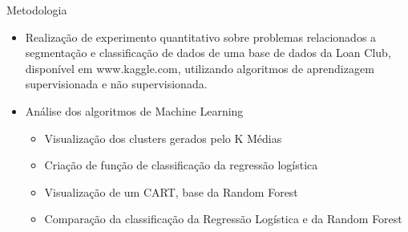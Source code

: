 \documentclass[final,hyperref={pdfpagelabels=false, brazil}]{beamer}
\begin{document}
\begin{frame}[t]
\begin{columns}[t]
\begin{column}{.465\textwidth}



\begin{block}{Metodologia}

\begin{itemize}
\item Realização de experimento quantitativo sobre problemas relacionados a segmentação e classificação de dados de uma base de dados da Loan Club, disponível em www.kaggle.com, utilizando algoritmos de aprendizagem supervisionada e não supervisionada.

\end{itemize}

\begin{itemize}
\item Análise dos algoritmos de Machine Learning
\begin{itemize}
\item Visualização dos clusters gerados pelo K Médias 
\item Criação de função de classificação da regressão logística
\item Visualização de um CART, base da Random Forest
\item Comparação da classificação da Regressão Logística e da Random Forest
\end{itemize}
\end{itemize}

\end{block}



\end{column}
\end{columns}
\end{frame}
\end{document}
